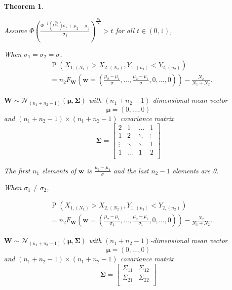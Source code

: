 \documentclass[12pt]{article}
\DeclareMathOperator*{\Prob}{P}
\newtheorem{theorem}{Theorem}[section]
\begin{document}
\begin{theorem} \label{theorem:normalgeneral}

Assume $\Phi(\frac{\Phi^{-1}(t^{\frac{N_2}{n_2}})\sigma_2 + \mu_2 - \mu_1}{\sigma_1})^{\frac{n_1}{N_1}} > t$ for all $t \in (0,1)$,

When $\sigma_1 = \sigma_2 = \sigma$,
	\begin{align*}
	&\Prob\left(X_{1,(N_1)} > X_{2,(N_2)}, Y_{1,(n_1)} < Y_{2,(n_2)}\right) \\
  &= n_2F_{\mathbf{W}}(\mathbf{w} = (\frac{\mu_2 - \mu_1}{\sigma}, \dots, \frac{\mu_2 - \mu_1}{\sigma}, 0, \dots, 0)) - \frac{N_2}{N_1 + N_2}.
\end{align*}

$\mathbf{W} \sim \mathcal{N}_{(n_1 + n_2 - 1)}(\boldsymbol{\mu}, \boldsymbol{\Sigma})$ with $(n_1 + n_2 - 1)$-dimensional mean vector $$\boldsymbol{\mu} = (0, \dots, 0)$$ and $(n_1 + n_2 - 1) \times (n_1 + n_2 - 1)$ covariance matrix  $$\boldsymbol{\Sigma} = \begin{bmatrix}
2 & 1 & \dots & 1\\
1 & 2 & \ddots  & \vdots \\
\vdots & \ddots & \ddots & 1\\
1 & \dots & 1 & 2\\
\end{bmatrix}$$

The first $n_1$ elements of $\mathbf{w}$ is $\frac{\mu_2 - \mu_1}{\sigma}$ and the last $n_2-1$ elements are 0. 

When $\sigma_1 \neq \sigma_2$, 

\begin{align*}
	&\Prob\left(X_{1,(N_1)} > X_{2,(N_2)}, Y_{1,(n_1)} < Y_{2,(n_2)}\right) \\
  &= n_2F_{\mathbf{W}}(\mathbf{w} = (\frac{\mu_2 - \mu_1}{\sigma_1}, \dots, \frac{\mu_2 - \mu_1}{\sigma_1}, 0, \dots, 0)) - \frac{N_2}{N_1 + N_2}.
\end{align*}

$\mathbf{W} \sim \mathcal{N}_{(n_1 + n_2 - 1)}(\boldsymbol{\mu}, \boldsymbol{\Sigma})$ with $(n_1 + n_2 - 1)$-dimensional mean vector $$\boldsymbol{\mu} = (0, \dots, 0)$$ and $(n_1 + n_2 - 1) \times (n_1 + n_2 - 1)$ covariance matrix $$\boldsymbol{\Sigma} = \begin{bmatrix}
	\Sigma_{11} & \Sigma_{12}\\
	\Sigma_{21} & \Sigma_{22}\\
\end{bmatrix}$$


\end{theorem}
\end{document}

